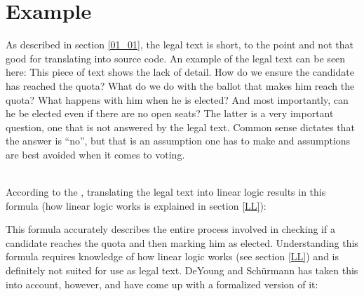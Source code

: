 \section{Example}
\label{E}

As described in section \ref{01_01}, the legal text is short, to the point and not that good for translating into source code. An example of the legal text can be seen here:
This piece of text shows the lack of detail. How do we ensure the candidate has reached the quota? What do we do with the ballot that makes him reach the quota? What happens with him when he is elected? And most importantly, can he be elected even if there are no open seats? The latter is a very important question, one that is not answered by the legal text. Common sense dictates that the answer is “no”, but that is an assumption one has to make and assumptions are best avoided when it comes to voting.

 \\
According to the , translating the legal text into linear logic results in this formula (how linear logic works is explained in section \ref{LL}):

\begin{texto}
\end{texto}

This formula accurately describes the entire process involved in checking if a candidate reaches the quota and then marking him as elected. Understanding this formula requires knowledge of how linear logic works (see section \ref{LL}) and is definitely not suited for use as legal text. DeYoung and Schürmann has taken this into account, however, and have come up with a formalized version of it:

